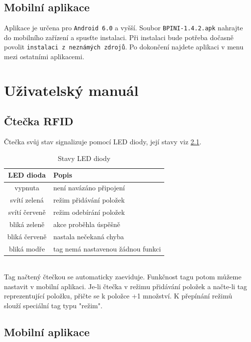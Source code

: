 \documentclass[czech,BP]{thesiskiv}
\begin{document}
	\section{Mobilní aplikace}
	

Aplikace je určena pro \texttt{Android 6.0} a vyšší.	
Soubor \texttt{BPINI-1.4.2.apk} nahrajte do mobilního zařízení a spusťte instalaci.
Při instalaci bude potřeba dočasně povolit \texttt{instalaci z neznámých zdrojů}.
Po dokončení najdete aplikaci v menu mezi ostatními aplikacemi.


\chapter{Uživatelský manuál}

	\section{Čtečka RFID}
Čtečka svůj stav signalizuje pomocí LED diody, její stavy viz \ref{table:led_states}.

\begin{table}[H]
\centering
\begin{tabular}{ c | p{6cm} }
\textbf{LED dioda} & \textbf{Popis} \\ \hline\hline
vypnuta & není navázáno připojení \\ \hline  
svítí zelená & režim přidávání položek \\ \hline
svítí červeně & režim odebírání položek \\ \hline
bliká zeleně & akce proběhla úspěšně \\ \hline
bliká červeně & nastala nečekaná chyba  \\ \hline
bliká modře & tag nemá nastavenou žádnou funkci  \\ \hline
\end{tabular}
\caption{Stavy LED diody}
\label{table:led_states}
\end{table}
\ \\
Tag načtený čtečkou se automaticky zaeviduje. Funkčnost tagu potom můžeme nastavit v mobilní aplikaci.
Je-li čtečka v režimu přidávání položek a načte-li tag reprezentující položku, přičte se k položce +1 množství.
K přepínání režimů slouží speciální tag typu "režim".

\newpage

	\section{Mobilní aplikace}
	
\end{document}
